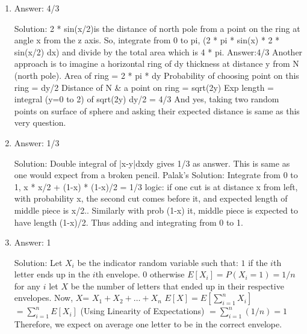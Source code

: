 \begin{enumerate}

\item
Answer: 4/3
 
Solution: 2 * sin(x/2)is the distance of north pole from a point on the ring at angle x from the z axis. So, integrate from 0 to pi, (2 * pi * sin(x) * 2 * sin(x/2) dx) and divide by the total area which is 4 * pi.
Answer:4/3
Another approach is to imagine a horizontal ring of dy thickness at distance y from N (north pole).
Area of ring = 2 * pi * dy
Probability of choosing point on this ring = dy/2
Distance of N \& a point on ring = sqrt(2y)
Exp length = integral (y=0 to 2) of sqrt(2y) dy/2 = 4/3
And yes, taking two random points on surface of sphere and asking their expected distance is same as this very question.




\item
Answer: 1/3
 
Solution: Double integral of |x-y|dxdy gives 1/3 as answer. This is same as one would expect from a broken pencil.
Palak's Solution:
Integrate from 0 to 1, x * x/2 + (1-x) * (1-x)/2 = 1/3
logic: if one cut is at distance x from left, with probability x, the second cut comes before it, and expected length of middle piece is x/2.. Similarly with prob (1-x) it, middle piece is expected to have length (1-x)/2. Thus adding and integrating from 0 to 1.




\item
Answer: 1
 
Solution: Let $X_i$ be the indicator random variable such that:
$1$ if the $i$th letter ends up in the $i$th envelope.
$0$ otherwise
$E[X_i] = P(X_i = 1) = 1/n$ for any $i$
let $X$ be the number of letters that ended up in their respective envelopes.
Now, $X$= $X_1 + X_2+ \ldots +X_n$
$E[X] = E[\sum_{i=1}^{n} X_i]$
$= \sum_{i=1}^{n} E[X_i]$ (Using Linearity of Expectations)
$=\sum_{i=1}^{n} (1/n) = 1$
Therefore, we expect on average one letter to be in the correct envelope.




\end{enumerate}
